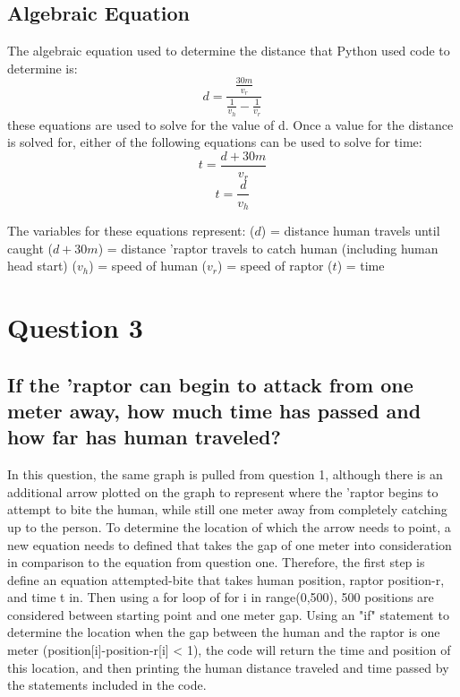 \documentclass[twocolumn]{revtex4}
\begin{document}
\subsection{Algebraic Equation}
The algebraic equation used to determine the distance that Python used code to determine is:
$$d=\frac{\frac{30m}{v_r}}{{\frac{1}{v_h}}-{\frac{1}{v_r}}}$$
these equations are used to solve for the value of d. Once a value for the distance is solved for, either of the following equations can be used to solve for time:
$$ t = \frac{d+30m}{v_r} $$ $$t = \frac{d}{v_h} $$

The variables for these equations represent:
($d$) = distance human travels until caught
($d+30m$) = distance 'raptor travels to catch human (including human head start)
($v_h$) = speed of human
($v_r$) = speed of raptor
($t$) = time

\section{Question 3}
\subsection{If the 'raptor can begin to attack from one meter away, how much time has passed and how far has human traveled?}
In this question, the same graph is pulled from question 1, although there is an additional arrow plotted on the graph to represent where the 'raptor begins to attempt to bite the human, while still one meter away from completely catching up to the person. To determine the location of which the arrow needs to point, a new equation needs to defined that takes the gap of one meter into consideration in comparison to the equation from question one. Therefore, the first step is define an equation attempted-bite that takes human position, raptor position-r, and time t in. Then using a for loop of for i in range(0,500), 500 positions are considered between starting point and one meter gap. Using an "if" statement to determine the location when the gap between the human and the raptor is one meter   (position[i]-position-r[i] < 1), the code will return the time and position of this location, and then printing the human distance traveled and time passed by the statements included in the code.
\end{document}
